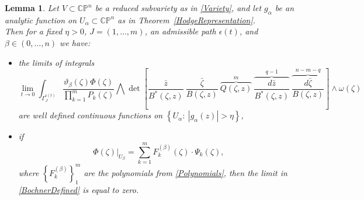 \documentclass[11pt,reqno]{amsart}
\numberwithin{equation}{section}
\newtheorem{lemma}[proposition]{Lemma}
\begin{document}
\begin{lemma}\label{BochnerIntegrals} Let $V\subset {{\mathbb C}}{{\mathbb P}}^n$ be a reduced
subvariety as in \eqref{Variety}, and let $g_{\alpha}$ be an analytic function on $U_{\alpha}\subset {{\mathbb C}}{{\mathbb P}}^n$ as in
Theorem~\ref{HodgeRepresentation}.\\
\indent
Then for a fixed $\eta>0$, $J=(1,\dots,m)$, an admissible path $\epsilon(t)$,
and $\beta\in(0,\dots,n)$ we have:
\begin{itemize}
\item[(i)] the limits of integrals
\begin{equation}\label{BochnerDefined}
\lim_{t\to 0}\int_{\Gamma^{\epsilon(t)}_J}
\frac{\vartheta_{\beta}(\zeta)\Phi(\zeta)}{\prod_{k=1}^mP_k(\zeta)}
\bigwedge\det\left[\frac{\bar z}{B^*(\zeta,z)}\ \frac{\bar\zeta}{B(\zeta,z)}\
\overbrace{Q(\zeta,z)}^{m}\
\overbrace{\frac{d{\bar z}}{B^*(\zeta,z)}}^{q-1}\
\overbrace{\frac{d{\bar\zeta}}{B(\zeta,z)}}^{n-m-q}\right]\wedge\omega(\zeta)
\end{equation}
are well defined continuous functions on $\left\{U_{\alpha}:\ |g_{\alpha}(z)|>\eta\right\}$,
\item[(ii)]
if
\begin{equation}\label{PhiClosed}
\Phi(\zeta)\Big|_{U_{\beta}}=\sum_{k=1}^m F^{(\beta)}_k(\zeta)\cdot \Psi_k(\zeta),
\end{equation}
where $\left\{F^{(\beta)}_k\right\}_1^m$ are the polynomials from \eqref{Polynomials},
then the limit in \eqref{BochnerDefined} is equal to zero.
\end{itemize}
\end{lemma}
\end{document}
